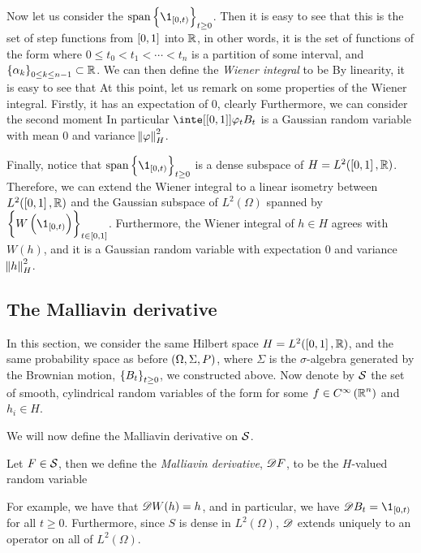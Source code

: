 \documentclass[../main.tex]{subfiles}
\begin{document}
Now let us consider the $\span\cbr{\1_{\intco{0,t}}}_{t\geq0}$. Then it is easy to see that this is the set of step functions from $\intcc{0,1}$ into $\R$, in other words, it is the set of functions of the form  where $0 \leq t_0 <t_1<\cdots <t_n$ is a partition of some interval, and $\cbr{\alpha_k}_{0\leq k\leq n-1}\subset\R$. We can then define the \emph{Wiener integral} to be  By linearity, it is easy to see that  At this point, let us remark on some properties of the Wiener integral. Firstly, it has an expectation of $0$, clearly  Furthermore, we can consider the second moment  In particular $\inte[\intcc{0,1}]{\varphi_t}{B_t}$ is a Gaussian random variable with mean $0$ and variance $\norm{\varphi}_H^2$.

Finally, notice that $\span\cbr{\1_{\intco{0,t}}}_{t\geq0}$ is a dense subspace of $H = L^2(\intcc{0,1},\R)$. Therefore, we can extend the Wiener integral to a linear isometry  between $L^2(\intcc{0,1},\R)$ and the Gaussian subspace of $L^2(\Omega)$ spanned by $\cbr{W\del{\1_{\intco{0,t}}}}_{t\in\intcc{0,1}}$. Furthermore, the Wiener integral of $h\in H$ agrees with $W(h)$, and it is a Gaussian random variable with expectation $0$ and variance $\norm{h}_H^2$.

\subsection{The Malliavin derivative}
In this section, we consider the same Hilbert space $H = L^2(\intcc{0,1},\R)$, and the same probability space as before $\del{\Omega,\Sigma,P}$, where $\Sigma$ is the $\sigma$-algebra generated by the Brownian motion, $\cbr{B_t}_{t\geq0}$, we constructed above. Now denote by $\S$ the set of smooth, cylindrical random variables of the form  for some $f\in C^\infty\del{\R^n}$ and $h_i\in H$. 

We will now define the Malliavin derivative on $\S$.
\begin{definition}
\label{def:Mall_deriv}
Let $F\in\S$, then we define the \emph{Malliavin derivative}, $\Dif F$, to be the $H$-valued random variable 
\end{definition}
For example, we have that $\Dif W(h) = h$, and in particular, we have $\Dif B_t = \1_{\intco{0,t}}$ for all $t\geq0$. Furthermore, since $S$ is dense in $L^2(\Omega)$, $\Dif$ extends uniquely to an operator on all of $L^2(\Omega)$.
\end{document}
